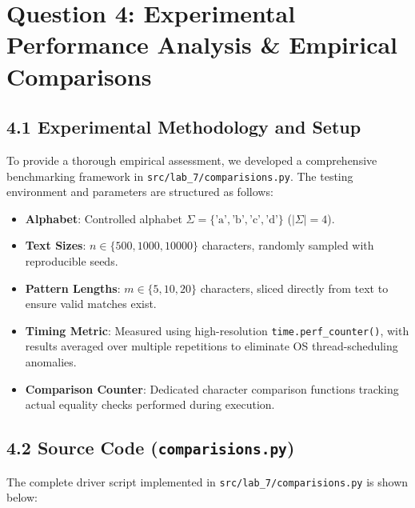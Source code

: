 \documentclass[12pt]{article}
\begin{document}
\vspace{0.4cm}

\section*{Question 4: Experimental Performance Analysis \& Empirical Comparisons}

\subsection*{4.1 Experimental Methodology and Setup}
To provide a thorough empirical assessment, we developed a comprehensive benchmarking framework in \texttt{src/lab\_7/comparisions.py}. The testing environment and parameters are structured as follows:
\begin{itemize}
    \item \textbf{Alphabet}: Controlled alphabet $\Sigma = \{\text{'a'}, \text{'b'}, \text{'c'}, \text{'d'}\}$ ($|\Sigma| = 4$).
    \item \textbf{Text Sizes}: $n \in \{500, 1000, 10000\}$ characters, randomly sampled with reproducible seeds.
    \item \textbf{Pattern Lengths}: $m \in \{5, 10, 20\}$ characters, sliced directly from text to ensure valid matches exist.
    \item \textbf{Timing Metric}: Measured using high-resolution \texttt{time.perf\_counter()}, with results averaged over multiple repetitions to eliminate OS thread-scheduling anomalies.
    \item \textbf{Comparison Counter}: Dedicated character comparison functions tracking actual equality checks performed during execution.
\end{itemize}

\subsection*{4.2 Source Code (\texttt{comparisions.py})}
The complete driver script implemented in \texttt{src/lab\_7/comparisions.py} is shown below:
\end{document}
